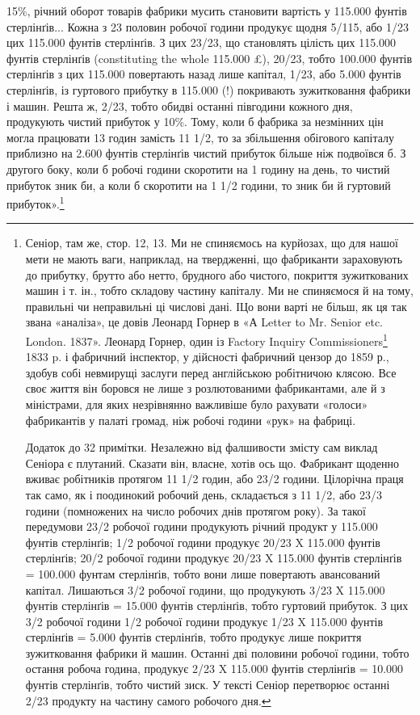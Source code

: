 \parcont{}  %
15\%, річний оборот товарів фабрики мусить становити вартість у 115.000 фунтів стерлінґів... Кожна з
23 половин робочої години продукує щодня 5/115, або 1/23 цих 115.000 фунтів стерлінґів. З цих 23/23,
що становлять цілість цих 115.000 фунтів стерлінґів (constituting the whole 115.000 £), 20/23, тобто
100.000 фунтів стерлінґів з цих 115.000 повертають назад лише капітал, 1/23, або 5.000 фунтів
стерлінґів, із гуртового прибутку в 115.000 (!) покривають зужитковання фабрики і машин. Решта ж,
2/23, тобто обидві останні півгодини кожного дня, продукують чистий прибуток
у 10\%. Тому, коли б фабрика за незмінних цін могла працювати 13 годин замість 11 1/2, то за
збільшення обігового
капіталу приблизно на 2.600 фунтів стерлінґів чистий прибуток більше ніж подвоївся б. З другого
боку, коли б робочі години скоротити на 1 годину на день, то чистий прибуток зник би, а коли б
скоротити на 1 1/2 години, то зник би й гуртовий прибуток».\footnote{
Сеніор, там же, стор. 12, 13. Ми не спиняємось на курйозах, що для нашої мети не мають ваги,
наприклад, на твердженні, що фабриканти зараховують до прибутку, брутто або нетто, брудного або
чистого, покриття зужиткованих машин і т. ін., тобто складову частину капіталу. Ми не
спиняємося й на тому, правильні чи неправильні ці числові дані. ІЦо вони
варті не більш, як ця так звана «аналіза», це довів Леонард Горнер в «А Letter to Mr. Senior etc.
London. 1837». Леонард Горнер, один із Factory Inquiry Commissioners\footnote*{
— членів комісії для розсліду відносин по фабриках. \emph{Ред.}
} 1833 p. і фабричний
інспектор, у дійсності
фабричний цензор до 1859 р., здобув собі невмирущі заслуги перед англійською робітничою клясою. Все
своє життя він боровся не лише з розлютованими фабрикантами, але й з міністрами, для яких
незрівнянно важливіше було рахувати «голоси» фабрикантів у палаті громад, ніж
робочі години «рук» на фабриці.

Додаток до 32 примітки. Незалежно від фалшивости змісту сам виклад Сеніора є плутаний. Сказати він,
власне, хотів ось що. Фабрикант щоденно вживає робітників протягом 11 1/2 годин, або 23/2 години.
Цілорічна праця так само, як і поодинокий робочий день, складається з 11 1/2,
або 23/3 години (помножених на число робочих днів протягом року). За такої передумови 23/2 робочої
години продукують річний продукт у 115.000 фунтів стерлінґів; 1/2 робочої години продукує 20/23 X
115.000 фунтів стерлінґів; 20/2 робочої години продукує 20/23 X 115.000 фунтів стерлінґів = 100.000
фунтам стерлінґів, тобто вони лише повертають
авансований капітал. Лишаються 3/2 робочої години, що продукують 3/23 X 115.000 фунтів стерлінґів =
15.000 фунтів стерлінґів, тобто гуртовий прибуток. З цих 3/2 робочої години 1/2 робочої години
продукує 1/23 X 115.000 фунтів стерлінґів = 5.000 фунтів стерлінґів, тобто продукує
лише покриття зужитковання фабрики й машин. Останні дві половини робочої години, тобто остання
робоча година, продукує 2/23 X 115.000 фунтів стерлінґів = 10.000 фунтів стерлінґів, тобто чистий
зиск.
У тексті Сеніор перетворює останні 2/23 продукту на частину самого робочого
дня.
}

